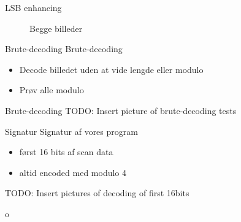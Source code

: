 \begin{frame}{LSB enhancing}
\begin{figure}
\centering
{}
\caption{Begge billeder}
\end{figure}
\end{frame}

\begin{frame}{Brute-decoding}
	Brute-decoding
		\begin{itemize}
		\item Decode billedet uden at vide lengde eller modulo
		\item Prøv alle modulo
		\end{itemize}
\end{frame}

\begin{frame}{Brute-decoding}
TODO: Insert picture of brute-decoding tests
\end{frame}

\begin{frame}{Signatur}
	Signatur af vores program
		\begin{itemize}
		\item først 16 bits af scan data
		\item altid encoded med modulo 4
		\end{itemize}
\end{frame}

\begin{frame}
TODO: Insert pictures of decoding of first 16bits
\end{frame}o